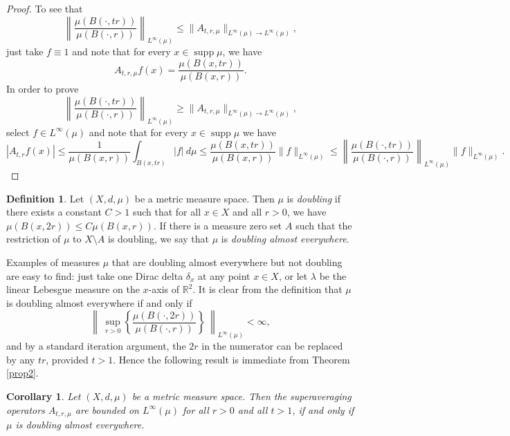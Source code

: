 \documentclass[12pt]{amsart}
\newtheorem{corollary}[theorem]{Corollary}
\theoremstyle{definition}
\newtheorem{definition}[theorem]{Definition}
\theoremstyle{parrafo}
\newcommand{\R}{\mathbb{R}}
\begin{document}
\begin{proof} To see that  
$$
\left\| \dfrac{\mu (B(\cdot,tr))}{\mu (B(\cdot,r))} \right\|_{L^\infty (\mu)}\leq \|A_{t, r,\mu}\|_{L^\infty (\mu)  \to L^\infty (\mu)},
$$ just take $f \equiv 1$ and note that for every $x \in \operatorname{supp} \mu$, we have 
$$
A_{t, r ,\mu}f(x) = \dfrac{\mu (B(x,tr))}{\mu (B(x,r))}.
$$ 
In order to prove 
$$
\left\| \dfrac{\mu (B(\cdot,tr))}{\mu (B(\cdot,r))} \right\|_{L^\infty (\mu)}
\geq
 \|A_{t, r,\mu}\|_{L^\infty (\mu)  \to L^\infty (\mu)},
$$
select $f \in L^{\infty}(\mu)$ and note that for every $x \in \operatorname{supp} \mu$  we have 		
$$
		| A_{t,r}f(x)| \leq \frac{1}{\mu(B(x, r))} \int _{B(x, tr)}  |f| \ d\mu \leq \frac{\mu(B(x, tr))}{\mu(B(x, r))} \| f \|_{L^\infty (\mu)} \leq 	\left\| \dfrac{\mu (B(\cdot,tr))}{\mu (B(\cdot,r))} \right\|_{L^\infty (\mu)} \| f \|_{L^\infty (\mu)}.
		$$
\end{proof}

	
\begin{definition}
	Let $(X,d,\mu)$ be a metric measure space. Then  $\mu$ is  {\em doubling} if there exists a constant $C > 1$ such that for all $x \in X$ and all $r > 0$, we have $\mu(B(x,2r)) \leq C\mu(B(x,r))$. If there is a measure zero set $A$ such that the restriction of $\mu$ to $X \setminus A$ is doubling, we say that $\mu$ is {\em doubling almost everywhere}.
\end{definition}	

Examples of measures $\mu$ that are doubling almost everywhere but not doubling are easy to find: just take one  Dirac delta $\delta_x$ at any point  $x\in X$, or let $\lambda$ be the linear Lebesgue measure on the $x$-axis of $\R^2$. It is clear from the definition that  $\mu$ is  doubling almost everywhere if and only if  
$$
\left\| \  \underset{ r > 0}{\sup} \left\{\dfrac{\mu (B(\cdot,2r))}{\mu (B(\cdot,r))} \right\} \ \right \|_{L^\infty (\mu)} < \infty,
$$ 
and  by a standard iteration argument, the $2r$ in the numerator can be replaced by any $t r$, provided $t > 1$. Hence the following result is immediate from Theorem \ref{prop2}.

			\begin{corollary} \label{doub} Let $(X, d,\mu)$ be a  metric measure space. 
	Then  the superaveraging operators $A_{t, r, \mu}$ are bounded on     
	$L^{\infty} (\mu)$ for all $r > 0$ and all $t > 1$, if and only if $\mu$ is doubling almost everywhere. 
\end{corollary}
\end{document}
